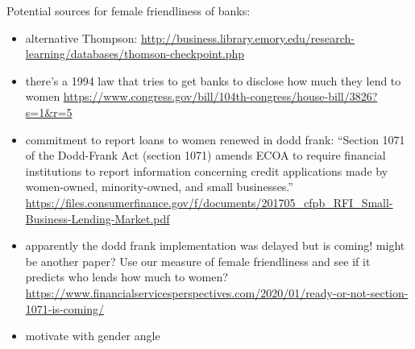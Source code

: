Potential sources for female friendliness of banks:

		\begin{itemize}
			\item alternative Thompson: \url{http://business.library.emory.edu/research-learning/databases/thomson-checkpoint.php}
			\item there's a 1994 law that tries to get banks to disclose how much they lend to women \url{https://www.congress.gov/bill/104th-congress/house-bill/3826?s=1&r=5}
			\item commitment to report loans to women renewed in dodd frank:
			``Section 1071 of the Dodd-Frank Act (section 1071) amends ECOA to require financial institutions to report information concerning credit applications made by women-owned, minority-owned, and small businesses.''
			\url{https://files.consumerfinance.gov/f/documents/201705_cfpb_RFI_Small-Business-Lending-Market.pdf}
			\item apparently the dodd frank implementation was delayed but is coming! might be another paper? Use our measure of female friendliness and see if it predicts who lends how much to women?\url{https://www.financialservicesperspectives.com/2020/01/ready-or-not-section-1071-is-coming/}
			\item motivate with gender angle
		\end{itemize}

